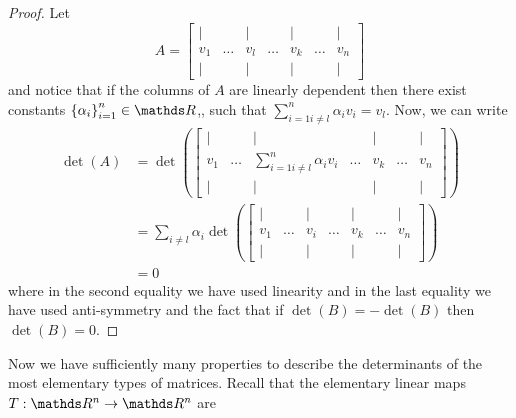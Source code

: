 \begin{proof}
Let 
\[
A=\left[\begin{array}{ccccccc}
| &  & | &  & | &  & |\\
v_{1} & \ldots & v_{l} & \ldots & v_{k} & \ldots & v_{n}\\
| &  & | &  & | &  & |
\end{array}\right]
\]
and notice that if the columns of $A$ are linearly dependent then
there exist constants $\left\{ \alpha_{i}\right\} _{i=1}^{n}\in\R$,,
such that $\sum_{i=1i\neq l}^{n}\alpha_{i}v_{i}=v_{l}.$ Now, we can
write
\begin{align*}
\det\left(A\right) & =\det\left(\left[\begin{array}{ccccccc}
| &  & | &  & | &  & |\\
v_{1} & \ldots & \sum_{i=1i\neq l}^{n}\alpha_{i}v_{i} & \ldots & v_{k} & \ldots & v_{n}\\
| &  & | &  & | &  & |
\end{array}\right]\right)\\
 & =\sum_{i\neq l}\alpha_{i}\det\left(\left[\begin{array}{ccccccc}
| &  & | &  & | &  & |\\
v_{1} & \ldots & v_{i} & \ldots & v_{k} & \ldots & v_{n}\\
| &  & | &  & | &  & |
\end{array}\right]\right)\\
 & =0
\end{align*}
where in the second equality we have used linearity and in the last
equality we have used anti-symmetry and the fact that if $\det\left(B\right)=-\det\left(B\right)$
then $\det\left(B\right)=0.$
\end{proof}
Now we have sufficiently many properties to describe the determinants
of the most elementary types of matrices. Recall that the elementary
linear maps $T:\R^{n}\to\R^{n}$ are
